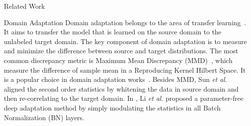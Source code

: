 \documentclass{article}
\begin{document}
\begin{section}{Related Work}
\begin{paragraph}{Domain Adaptation}
Domain adaptation belongs to the area of transfer learning~\cite{pan2010survey}. It aims to transfer the model that is learned on the source domain to the unlabeled target domain. The key component of domain adaptation is to measure and minimize the difference between source and target distributions. The most common discrepancy metric is Maximum Mean Discrepancy (MMD)~\cite{mmd}, which measure the difference of sample mean in a Reproducing Kernel Hilbert Space. It is a popular choice in domain adaptation works~\cite{ddc,dan,long2016unsupervised}. Besides MMD, Sun \emph{et al.}~\cite{coral} aligned the second order statistics by whitening the data in source domain and then re-correlating to the target domain. In \cite{adabn}, Li \emph{et al.} proposed a parameter-free deep adaptation method by simply modulating the statistics in all Batch Normalization (BN) layers.
\end{paragraph}


\end{section}
\end{document}
